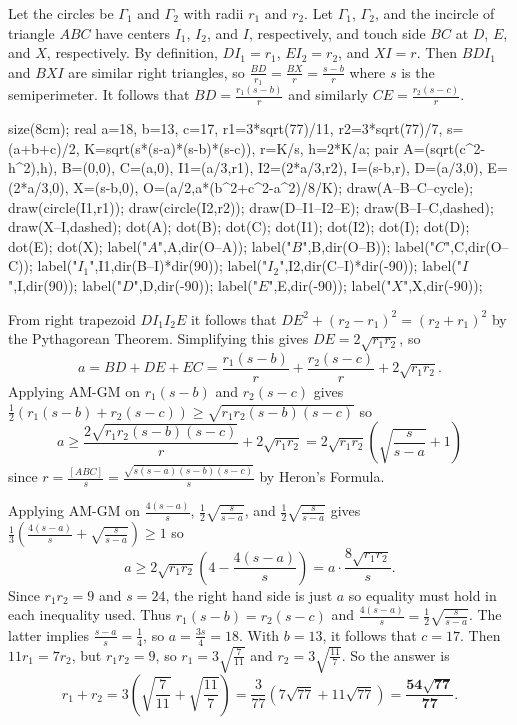 Let the circles be $\Gamma_1$ and $\Gamma_2$ with radii $r_1$ and $r_2$. Let $\Gamma_1$, $\Gamma_2$, and the incircle of triangle $ABC$ have centers $I_1$, $I_2$, and $I$, respectively, and touch side $BC$ at $D$, $E$, and $X$, respectively. By definition, $DI_1=r_1$, $EI_2=r_2$, and $XI=r$. Then $BDI_1$ and $BXI$ are similar right triangles, so $\frac{BD}{r_1}=\frac{BX}{r}=\frac{s-b}{r}$ where $s$ is the semiperimeter. It follows that $BD=\frac{r_1(s-b)}{r}$ and similarly $CE=\frac{r_2(s-c)}{r}$.
	\begin{center}
		\begin{asy}
			size(8cm);
			real a=18, b=13, c=17, r1=3*sqrt(77)/11, r2=3*sqrt(77)/7, s=(a+b+c)/2, K=sqrt(s*(s-a)*(s-b)*(s-c)), r=K/s, h=2*K/a;
			pair A=(sqrt(c^2-h^2),h), B=(0,0), C=(a,0), I1=(a/3,r1), I2=(2*a/3,r2), I=(s-b,r), D=(a/3,0), E=(2*a/3,0), X=(s-b,0), O=(a/2,a*(b^2+c^2-a^2)/8/K);
			draw(A--B--C--cycle); draw(circle(I1,r1)); draw(circle(I2,r2)); draw(D--I1--I2--E); draw(B--I--C,dashed); draw(X--I,dashed);
			dot(A); dot(B); dot(C); dot(I1); dot(I2); dot(I); dot(D); dot(E); dot(X);
			label("$A$",A,dir(O--A)); label("$B$",B,dir(O--B)); label("$C$",C,dir(O--C)); label("$I_1$",I1,dir(B--I)*dir(90)); label("$I_2$",I2,dir(C--I)*dir(-90)); label("$I$",I,dir(90)); label("$D$",D,dir(-90)); label("$E$",E,dir(-90)); label("$X$",X,dir(-90));
		\end{asy}
	\end{center}
	From right trapezoid $DI_1I_2E$ it follows that $DE^2+(r_2-r_1)^2=(r_2+r_1)^2$ by the Pythagorean Theorem. Simplifying this gives $DE=2\sqrt{r_1r_2}$, so
	\[
		a=BD+DE+EC=\frac{r_1(s-b)}{r}+\frac{r_2(s-c)}{r}+2\sqrt{r_1r_2}.
	\]
	Applying AM-GM on $r_1(s-b)$ and $r_2(s-c)$ gives $\frac{1}{2}\left(r_1(s-b)+r_2(s-c)\right)\geq\sqrt{r_1r_2(s-b)(s-c)}$ so
	\[
		a\geq\frac{2\sqrt{r_1r_2(s-b)(s-c)}}{r}+2\sqrt{r_1r_2}=2\sqrt{r_1r_2}\left(\sqrt{\frac{s}{s-a}}+1\right)
	\]
	since $r=\frac{[ABC]}{s}=\frac{\sqrt{s(s-a)(s-b)(s-c)}}{s}$ by Heron's Formula.
	
	Applying AM-GM on $\frac{4(s-a)}{s}$, $\frac{1}{2}\sqrt{\frac{s}{s-a}}$, and $\frac{1}{2}\sqrt{\frac{s}{s-a}}$ gives $\frac{1}{3}\left(\frac{4(s-a)}{s}+\sqrt{\frac{s}{s-a}}\right)\geq1$ so
	\[
		a\geq2\sqrt{r_1r_2}\left(4-\frac{4(s-a)}{s}\right)=a\cdot\frac{8\sqrt{r_1r_2}}{s}.
	\]
	Since $r_1r_2=9$ and $s=24$, the right hand side is just $a$ so equality must hold in each inequality used. Thus $r_1(s-b)=r_2(s-c)$ and $\frac{4(s-a)}{s}=\frac{1}{2}\sqrt{\frac{s}{s-a}}$. The latter implies $\frac{s-a}{s}=\frac{1}{4}$, so $a=\frac{3s}{4}=18$. With $b=13$, it follows that $c=17$. Then $11r_1=7r_2$, but $r_1r_2=9$, so $r_1=3\sqrt{\frac{7}{11}}$ and $r_2=3\sqrt{\frac{11}{7}}$. So the answer is
	\[
		r_1+r_2=3\left(\sqrt{\frac{7}{11}}+\sqrt{\frac{11}{7}}\right)=\frac{3}{77}\left(7\sqrt{77}+11\sqrt{77}\right)=\mathbf{\frac{54\sqrt{77}}{77}}.
	\]